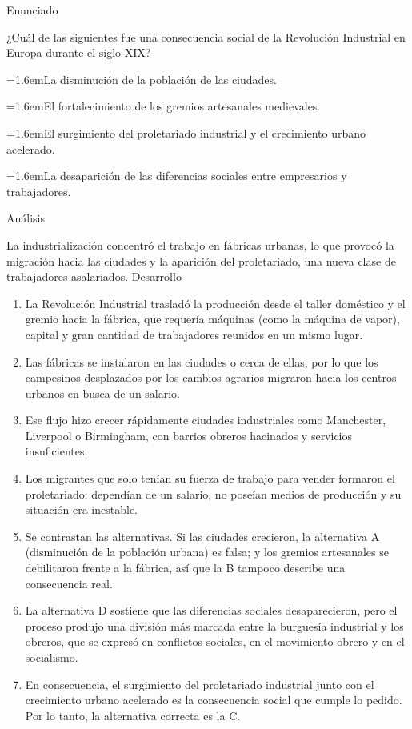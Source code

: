 \documentclass[10pt,a4paper,twocolumn]{article}
\newcommand{\alternativa}[2]{\par\noindent\hangindent=1.6em\hangafter=1\makebox[1.6em][l]{\tecla{#1}}#2\par}
\newcommand{\clave}[1]{\par\smallskip{\sffamily\footnotesize\color{esmeralda} Clave \teclaok{#1}}\par}
\begin{document}
\begin{ejemplo}
{\sffamily\footnotesize\color{zinc500} Enunciado}\par
¿Cuál de las siguientes fue una consecuencia social de la Revolución Industrial en Europa durante el siglo XIX?
\alternativa{A}{La disminución de la población de las ciudades.}
\alternativa{B}{El fortalecimiento de los gremios artesanales medievales.}
\alternativa{C}{El surgimiento del proletariado industrial y el crecimiento urbano acelerado.}
\alternativa{D}{La desaparición de las diferencias sociales entre empresarios y trabajadores.}
\clave{C}
{\sffamily\footnotesize\color{zinc500} Análisis}\par La industrialización concentró el trabajo en fábricas urbanas, lo que provocó la migración hacia las ciudades y la aparición del proletariado, una nueva clase de trabajadores asalariados.
{\sffamily\footnotesize\color{zinc500} Desarrollo}
\begin{enumerate}
  \item La Revolución Industrial trasladó la producción desde el taller doméstico y el gremio hacia la fábrica, que requería máquinas (como la máquina de vapor), capital y gran cantidad de trabajadores reunidos en un mismo lugar.
  \item Las fábricas se instalaron en las ciudades o cerca de ellas, por lo que los campesinos desplazados por los cambios agrarios migraron hacia los centros urbanos en busca de un salario.
  \item Ese flujo hizo crecer rápidamente ciudades industriales como Manchester, Liverpool o Birmingham, con barrios obreros hacinados y servicios insuficientes.
  \item Los migrantes que solo tenían su fuerza de trabajo para vender formaron el proletariado: dependían de un salario, no poseían medios de producción y su situación era inestable.
  \item Se contrastan las alternativas. Si las ciudades crecieron, la alternativa A (disminución de la población urbana) es falsa; y los gremios artesanales se debilitaron frente a la fábrica, así que la B tampoco describe una consecuencia real.
  \item La alternativa D sostiene que las diferencias sociales desaparecieron, pero el proceso produjo una división más marcada entre la burguesía industrial y los obreros, que se expresó en conflictos sociales, en el movimiento obrero y en el socialismo.
  \item En consecuencia, el surgimiento del proletariado industrial junto con el crecimiento urbano acelerado es la consecuencia social que cumple lo pedido. Por lo tanto, la alternativa correcta es la C.
\end{enumerate}
\end{ejemplo}
\end{document}
